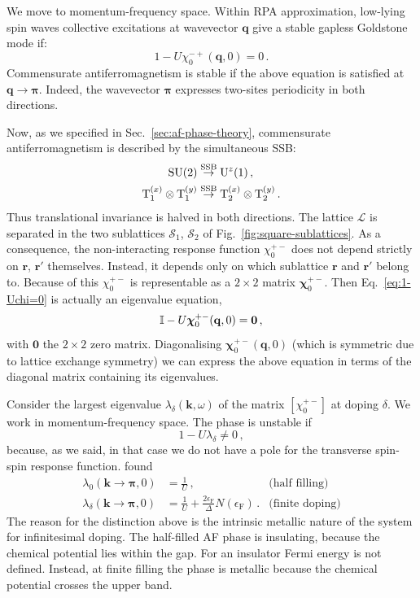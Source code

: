 We move to momentum-frequency space. Within RPA approximation, low-lying spin waves collective excitations at wavevector $\mathbf{q}$ give a stable gapless Goldstone mode if:
\begin{equation}\label{eq:1-Uchi=0}
	1-U\chi_0^{-+}(\mathbf{q},0) = 0 \, .
\end{equation}
Commensurate antiferromagnetism is stable if the above equation is satisfied at $\mathbf{q}\to\bm{\pi}$. Indeed, the wavevector $\bm{\pi}$ expresses two-sites periodicity in both directions.

Now, as we specified in Sec.~\ref{sec:af-phase-theory}, commensurate antiferromagnetism is described by the simultaneous SSB:
\[
\begin{aligned}
	\mathrm{SU}(2) &\stackrel{\mathrm{SSB}}{\to} \mathrm{U}^z(1) \, , \\
	\mathrm{T}_1^{(x)} \otimes \mathrm{T}_1^{(y)} &\stackrel{\mathrm{SSB}}{\to} \mathrm{T}_2^{(x)} \otimes \mathrm{T}_2^{(y)} \, .
\end{aligned}
\]
Thus translational invariance is halved in both directions. The lattice $\mathcal{L}$ is separated in the two sublattices $\mathcal{S}_1$, $\mathcal{S}_2$ of Fig.~\ref{fig:square-sublattices}. As a consequence, the non-interacting response function $\chi_0^{+-}$ does not depend strictly on $\mathbf{r}$, $\mathbf{r}'$ themselves. Instead, it depends only on which sublattice $\mathbf{r}$ and $\mathbf{r}'$ belong to. Because of this $\chi_0^{+-}$ is representable as a $2 \times 2$ matrix $\bm{\chi}_0^{+-}$. Then Eq.~\eqref{eq:1-Uchi=0} is actually an eigenvalue equation,
\[
	\mathbb{I} - U \bm{\chi}_0^{+-}(\mathbf{q},0) = \bm{0} \, ,
\]
with $\bm{0}$ the $2\times2$ zero matrix. Diagonalising $\bm{\chi}_0^{+-}(\mathbf{q},0)$ (which is symmetric due to lattice exchange symmetry) we can express the above equation in terms of the diagonal matrix containing its eigenvalues.

Consider the largest eigenvalue $\lambda_\delta(\mathbf{k},\omega)$ of the matrix $[\chi_0^{+-}]$ at doping $\delta$. We work in momentum-frequency space. The phase is unstable if
\begin{equation}\label{appeq:af-instability-condition}
	1 - U \lambda_\delta \neq 0 \, ,
\end{equation}
because, as we said, in that case we do not have a pole for the transverse spin-spin response function. \citeauthor{singh1990collective} \cite{singh1990collective} found 
\begin{align}
	\lambda_0(\mathbf{k}\to\bm{\pi},0) &= \frac 1 U \, , &\text{(half filling)} \label{appeq:af-unstable-half} \\
	\lambda_\delta(\mathbf{k}\to\bm{\pi},0) &= \frac 1 U + \frac{2\epsilon_\mathrm{F}}{\Delta} N(\epsilon_\mathrm{F}) \, . &\text{(finite doping)} \label{appeq:af-unstable}
\end{align}
The reason for the distinction above is the intrinsic metallic nature of the system for infinitesimal doping. The half-filled AF phase is insulating, because the chemical potential lies within the gap. For an insulator Fermi energy is not defined. Instead, at finite filling the phase is metallic because the chemical potential crosses the upper band.

